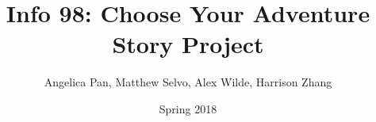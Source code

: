 \documentclass[ebook,11pt,oneside,openany]{memoir}
\begin{document}
\title{Info 98: Choose Your Adventure Story Project}

\author{Angelica Pan, Matthew Selvo, Alex Wilde, Harrison Zhang}
\date{Spring 2018}
\maketitle

\section*{}
\textnormal{
\\}


\end{document}
